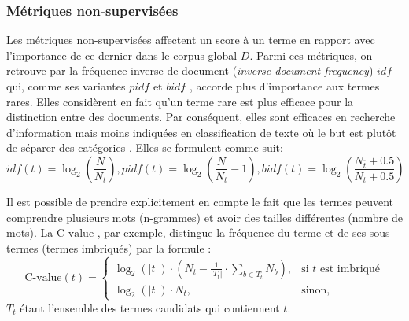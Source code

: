 
\subsubsection{Métriques non-supervisées}
Les métriques non-supervisées affectent un score à un terme en rapport avec l'importance de ce dernier dans le corpus global $D$. Parmi ces métriques, on retrouve par la fréquence inverse de document (\textit{inverse document frequency}) $idf$ \citep{sparck1972idf} qui, comme ses variantes $pidf$ \citep{wu1981pidf}  et $bidf$ \citep{jones2000bm25idf}, accorde plus d'importance aux termes rares. Elles considèrent en fait qu'un terme rare est plus efficace pour la distinction entre des documents. Par conséquent, elles sont efficaces en recherche d'information mais moins indiquées en classification de texte où le but est plutôt de séparer des catégories \citep{wu2017balancingtermweight}. Elles se formulent comme suit:
\[idf(t) = \log_2\left(\frac{N}{N_t}\right), pidf(t) = \log_2\left(\frac{N}{N_t} - 1\right), bidf(t) = \log_2\left(\frac{N_{\overline{t}} + 0.5}{N_t + 0.5}\right)\]

Il est possible de prendre explicitement en compte le fait que les termes peuvent comprendre plusieurs mots (n-grammes) et avoir des tailles différentes (nombre de mots). La $\text{C-value}$ \citep{frantzi2000CValueNCValue}, par exemple, distingue la fréquence du terme et de ses sous-termes (termes imbriqués) par la formule : %
\[\text{C-value}(t) = \begin{cases} \log_2(\vert t \vert) \cdot (N_t - \frac{1}{\vert T_t \vert} \cdot \sum\limits_{b \in T_t} N_b), & \mbox{si } t \mbox{ est imbriqué} \\ \log_2(\vert t \vert) \cdot N_t, & \mbox{sinon,} \end{cases}\]
$T_t$ étant l'ensemble des termes candidats qui contiennent $t$.


